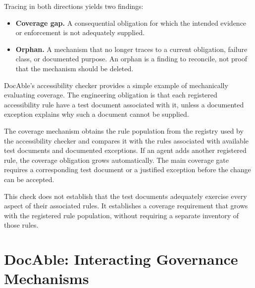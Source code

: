 
Tracing in both directions yields two findings:

\begin{itemize}
\tightlist
\item
  \textbf{Coverage gap.} A consequential obligation for which the intended evidence or enforcement is not adequately supplied.
\item
  \textbf{Orphan.} A mechanism that no longer traces to a current obligation, failure class, or documented purpose. An orphan is a finding to reconcile, not proof that the mechanism should be deleted.
\end{itemize}

DocAble's accessibility checker provides a simple example of mechanically evaluating coverage. The engineering obligation is that each registered accessibility rule have a test document associated with it, unless a documented exception explains why such a document cannot be supplied.

The coverage mechanism obtains the rule population from the registry used by the accessibility checker and compares it with the rules associated with available test documents and documented exceptions. If an agent adds another registered rule, the coverage obligation grows automatically. The main coverage gate requires a corresponding test document or a justified exception before the change can be accepted.

This check does not establish that the test documents adequately exercise every aspect of their associated rules. It establishes a coverage requirement that grows with the registered rule population, without requiring a separate inventory of those rules.

\section{DocAble: Interacting Governance Mechanisms}\label{heading:docable-interacting-governance-mechanisms}


